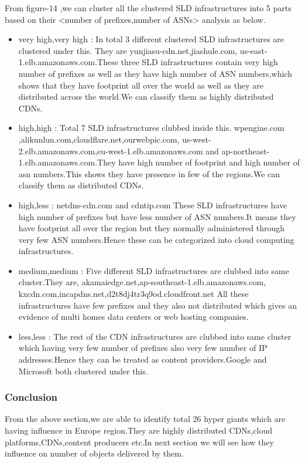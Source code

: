 From figure-14 ,we can cluster all the clustered SLD infrastructures into 5 parts based on their <number of prefixes,number of ASNs> analysis as below.

\begin{itemize}
\item very high,very high :
In total 3 different clustered SLD infrastructures are clustered under this.
They are yunjiasu-cdn.net,jiashule.com,
us-east-1.elb.amazonaws.com.These three SLD infrastructures contain very high number of prefixes as well as they have high number of ASN numbers,which shows that they have footprint all over the world  as well as they are distributed across the world.We can classify them as highly distributed CDNs.
\item high,high : 
Total 7 SLD infrastructures clubbed inside this. wpengine.com
,alikunlun.com,cloudflare.net,ourwebpic.com,
us-west-2.elb.amazonaws.com,eu-west-1.elb.amazonaws.com and 
ap-northeast-1.elb.amazonaws.com.They have high number of footprint and high number of asn numbers.This shows they have presence in few of the regions.We can classify them as distributed CDNs.
\item high,less  :
netdns-cdn.com and cdntip.com
These SLD infrastructures have high number of prefixes but have less number of ASN numbers.It means they have footprint all over the region but they normally administered through very few ASN numbers.Hence these can be categorized into cloud computing infrastructures. 
\item  medium,medium :
Five different SLD infrastructures are clubbed into same cluster.They are,
akamaiedge.net,ap-southeast-1.elb.amazonaws.com,
kxcdn.com,incapdns.net,d2t8dj4tr3q9od.cloudfront.net
 All these infrastructures have few prefixes and they also not distributed which gives an evidence of multi homes data centers or web hosting companies.
\item less,less :
The rest of the CDN infrastructures are clubbed into same cluster which having very few number of prefixes also very few number of IP addresses.Hence they can be treated as content providers.Google and Microsoft both clustered under this.
\end{itemize}

\pagebreak
\subsubsection{Conclusion}
From the above section,we are able to identify total 26 hyper giants which are having influence in Europe region.They are highly distributed CDNs,cloud platforms,CDNs,content producers etc.In next section we will see how they influence on number of objects delivered by them.

